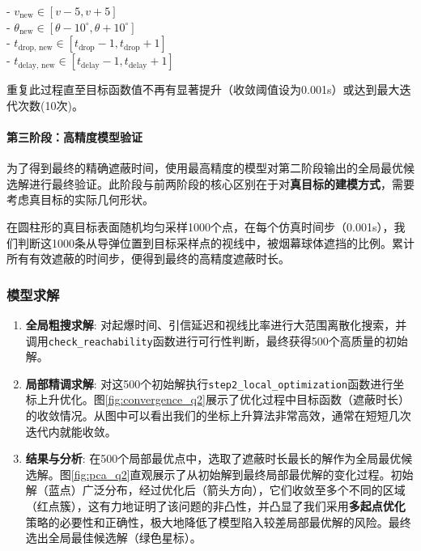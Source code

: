 \documentclass[12pt]{article}
\newcommand{\code}[1]{\texttt{#1}} %
\begin{document}
\begin{CJK}{UTF8}{gbsn}
		- $v_{\text{new}} \in [v-5, v+5]$\\
		\indent	- $\theta_{\text{new}} \in [\theta-10^\circ, \theta+10^\circ]$\\
		\indent	- $t_{\text{drop, new}} \in [t_{\text{drop}}-1, t_{\text{drop}}+1]$\\
		\indent	- $t_{\text{delay, new}} \in [t_{\text{delay}}-1, t_{\text{delay}}+1]$
		
		重复此过程直至目标函数值不再有显著提升（收敛阈值设为0.001s）或达到最大迭代次数(10次)。
		
		\paragraph{第三阶段：高精度模型验证}
		为了得到最终的精确遮蔽时间，使用最高精度的模型对第二阶段输出的全局最优候选解进行最终验证。此阶段与前两阶段的核心区别在于对\textbf{真目标的建模方式}，需要考虑真目标的实际几何形状。
		
		在圆柱形的真目标表面随机均匀采样1000个点，在每个仿真时间步（0.001s），我们判断这1000条从导弹位置到目标采样点的视线中，被烟幕球体遮挡的比例。累计所有有效遮蔽的时间步，便得到最终的高精度遮蔽时长。
		
		\subsubsection{模型求解}
		\begin{enumerate}
			\item \textbf{全局粗搜求解}: 对起爆时间、引信延迟和视线比率进行大范围离散化搜索，并调用\code{check\_reachability}函数进行可行性判断，最终获得500个高质量的初始解。
			
			\item \textbf{局部精调求解}: 对这500个初始解执行\code{step2\_local\_optimization}函数进行坐标上升优化。图\ref{fig:convergence_q2}展示了优化过程中目标函数（遮蔽时长）的收敛情况。从图中可以看出我们的坐标上升算法非常高效，通常在短短几次迭代内就能收敛。
			
			\item \textbf{结果与分析}: 在500个局部最优点中，选取了遮蔽时长最长的解作为全局最优候选解。图\ref{fig:pca_q2}直观展示了从初始解到最终局部最优解的变化过程。初始解（蓝点）广泛分布，经过优化后（箭头方向），它们收敛至多个不同的区域（红点簇），这有力地证明了该问题的非凸性，并凸显了我们采用\textbf{多起点优化}策略的必要性和正确性，极大地降低了模型陷入较差局部最优解的风险。最终选出全局最佳候选解（绿色星标）。
			

\end{enumerate}
\end{CJK}
\end{document}
